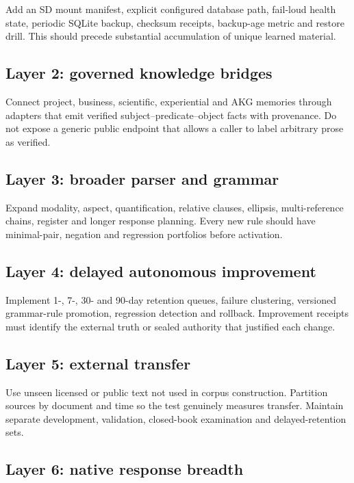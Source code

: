 \documentclass[11pt,a4paper]{article}
\begin{document}
Add an SD mount manifest, explicit configured database path, fail-loud health state, periodic
SQLite backup, checksum receipts, backup-age metric and restore drill. This should precede
substantial accumulation of unique learned material.

\subsection{Layer 2: governed knowledge bridges}

Connect project, business, scientific, experiential and AKG memories through adapters that
emit verified subject--predicate--object facts with provenance. Do not expose a generic public
endpoint that allows a caller to label arbitrary prose as verified.

\subsection{Layer 3: broader parser and grammar}

Expand modality, aspect, quantification, relative clauses, ellipsis, multi-reference chains,
register and longer response planning. Every new rule should have minimal-pair, negation and
regression portfolios before activation.

\subsection{Layer 4: delayed autonomous improvement}

Implement 1-, 7-, 30- and 90-day retention queues, failure clustering, versioned grammar-rule
promotion, regression detection and rollback. Improvement receipts must identify the external
truth or sealed authority that justified each change.

\subsection{Layer 5: external transfer}

Use unseen licensed or public text not used in corpus construction. Partition sources by
document and time so the test genuinely measures transfer. Maintain separate development,
validation, closed-book examination and delayed-retention sets.

\subsection{Layer 6: native response breadth}
\end{document}
